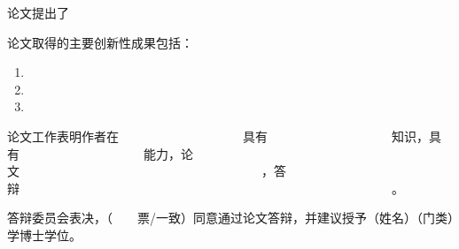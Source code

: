 
{}

\vspace{2em}
	
论文提出了
\vspace{8em}

论文取得的主要创新性成果包括：
\begin{enumerate}
	\item  
	\item 
	\vspace{6em}
	\item 
	\vspace{6em}
\end{enumerate}
\vspace{6em}

论文工作表明作者在~~~~~~~~~~~~~~~~~~~~具有~~~~~~~~~~~~~~~~~~~~知识，具有~~~~~~~~~~~~~~~~~~~~能力，论文~~~~~~~~~~~~~~~~~~~~~~~~~~~~~~~~~~~~~~~，答辩~~~~~~~~~~~~~~~~~~~~~~~~~~~~~~~~~~~~~~~~~~~~~~~~~~~~~~~~~~~~。

答辩委员会表决，（~~~~票/一致）同意通过论文答辩，并建议授予\underline{\quad\quad\quad}（姓名）\underline{\quad\quad\quad}（门类）学博士学位。
